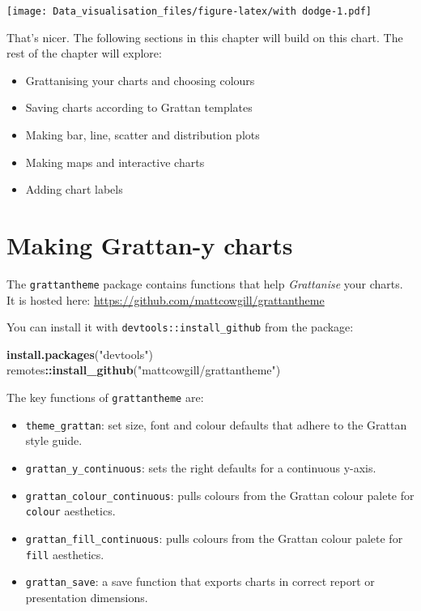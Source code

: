 \documentclass[]{book}
\newenvironment{Shaded}{\begin{snugshade}}{\end{snugshade}}
\newcommand{\KeywordTok}[1]{\textcolor[rgb]{0.13,0.29,0.53}{\textbf{#1}}}
\newcommand{\NormalTok}[1]{#1}
\newcommand{\OperatorTok}[1]{\textcolor[rgb]{0.81,0.36,0.00}{\textbf{#1}}}
\newcommand{\StringTok}[1]{\textcolor[rgb]{0.31,0.60,0.02}{#1}}
\providecommand{\tightlist}{%
  \setlength{\itemsep}{0pt}\setlength{\parskip}{0pt}}
\begin{document}
\texttt{[image: Data\_visualisation\_files/figure-latex/with dodge-1.pdf]}

That's nicer. The following sections in this chapter will build on this chart. The rest of the chapter will explore:

\begin{itemize}
\tightlist
\item
  Grattanising your charts and choosing colours
\item
  Saving charts according to Grattan templates
\item
  Making bar, line, scatter and distribution plots
\item
  Making maps and interactive charts
\item
  Adding chart labels
\end{itemize}

\hypertarget{making-grattan-y-charts}{%
\section{Making Grattan-y charts}\label{making-grattan-y-charts}}

The \texttt{grattantheme} package contains functions that help \emph{Grattanise} your charts. It is hosted here: \url{https://github.com/mattcowgill/grattantheme}

You can install it with \texttt{devtools::install\_github} from the package:

\begin{Shaded}
\begin{Highlighting}[]
\KeywordTok{install.packages}\NormalTok{(}\StringTok{"devtools"}\NormalTok{)}
\NormalTok{remotes}\OperatorTok{::}\KeywordTok{install_github}\NormalTok{(}\StringTok{"mattcowgill/grattantheme"}\NormalTok{)}
\end{Highlighting}
\end{Shaded}

The key functions of \texttt{grattantheme} are:

\begin{itemize}
\tightlist
\item
  \texttt{theme\_grattan}: set size, font and colour defaults that adhere to the Grattan style guide.
\item
  \texttt{grattan\_y\_continuous}: sets the right defaults for a continuous y-axis.
\item
  \texttt{grattan\_colour\_continuous}: pulls colours from the Grattan colour palete for \texttt{colour} aesthetics.
\item
  \texttt{grattan\_fill\_continuous}: pulls colours from the Grattan colour palete for \texttt{fill} aesthetics.
\item
  \texttt{grattan\_save}: a save function that exports charts in correct report or presentation dimensions.
\end{itemize}
\end{document}
